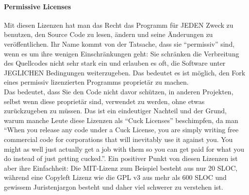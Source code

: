 \documentclass[a4paper,11pt]{article}
\begin{document}
\paragraph{Permissive Licenses}
Mit diesen Lizenzen hat man das Recht das Programm für JEDEN Zweck zu benutzen, den Source Code zu lesen, ändern und seine Änderungen zu veröffentlichen. Ihr Name kommt von der Tatsache, dass sie ``permissiv'' sind, wenn es um ihre wenigen Einschränkungen geht: Sie schränken die Verbreitung des Quellcodes nicht sehr stark ein und erlauben es oft, die Software unter JEGLICHEN Bedingungen weiterzugeben. Das bedeutet es ist möglich, den Fork eines permissiv lizenzierten Programms proprietär zu machen.\\

Das bedeutet, dass Sie den Code nicht davor schützen, in anderen Projekten, selbst wenn diese proprietär sind, verwendet zu werden, ohne etwas zurückzugeben zu müssen. Das ist ein eindeutiger Nachteil und der Grund, warum manche Leute diese Lizenzen als ``Cuck Licenses'' beschimpfen, da man ``When you release any code under a Cuck License, you are simply writing free commercial code for corporations that will inevitably use it against you. You might as well just actually get a job with them so you can get paid for what you do instead of just getting cucked.''. Ein positiver Punkt von diesen Lizenzen ist aber ihre Einfachheit: Die MIT-Lizenz zum Beispiel besteht aus nur 20 SLOC, während eine Copyleft Lizenz wie die GPL v3 aus mehr als 600 SLOC und gewissem Juristenjargon besteht und daher viel schwerer zu verstehen ist.\\
\end{document}
